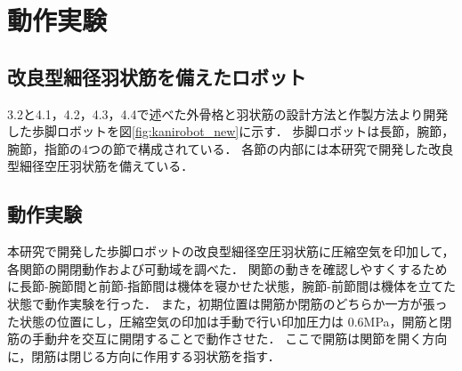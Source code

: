 \newpage
\section{動作実験}
\subsection{改良型細径羽状筋を備えたロボット}
3.2と4.1，4.2，4.3，4.4で述べた外骨格と羽状筋の設計方法と作製方法より開発した歩脚ロボットを図\ref{fig:kanirobot_new}に示す．
歩脚ロボットは長節，腕節，腕節，指節の4つの節で構成されている．
各節の内部には本研究で開発した改良型細径空圧羽状筋を備えている．
\subsection{動作実験}
本研究で開発した歩脚ロボットの改良型細径空圧羽状筋に圧縮空気を印加して，各関節の開閉動作および可動域を調べた．
関節の動きを確認しやすくするために長節-腕節間と前節-指節間は機体を寝かせた状態，腕節-前節間は機体を立てた状態で動作実験を行った．
また，初期位置は開筋か閉筋のどちらか一方が張った状態の位置にし，圧縮空気の印加は手動で行い印加圧力は 0.6MPa，開筋と閉筋の手動弁を交互に開閉することで動作させた．
ここで開筋は関節を開く方向に，閉筋は閉じる方向に作用する羽状筋を指す．

